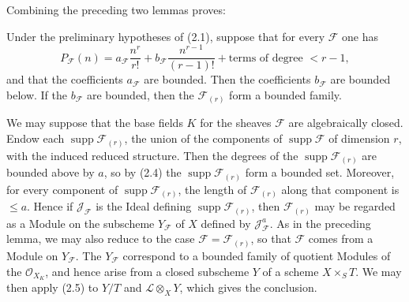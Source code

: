 Combining the preceding two lemmas proves:

 Under the preliminary hypotheses of (2.1), suppose that for
every $\mathcal F$ one has
\[
P_{\mathcal F}(n)=a_{\mathcal F}\frac{n^r}{r!}
+b_{\mathcal F}\frac{n^{r-1}}{(r-1)!}
+\text{terms of degree $<r-1$},
\]
and that the coefficients $a_{\mathcal F}$ are bounded. Then the coefficients
$b_{\mathcal F}$ are bounded below. If the $b_{\mathcal F}$ are bounded, then
the $\mathcal F_{(r)}$ form a bounded family.

We may suppose that the base fields $K$ for the sheaves $\mathcal F$ are
algebraically closed. Endow each
$\operatorname{supp}\mathcal F_{(r)}$, the union of the components of
$\operatorname{supp}\mathcal F$ of dimension $r$, with the induced reduced
structure. Then the degrees of the $\operatorname{supp}\mathcal F_{(r)}$ are
bounded above by $a$, so by (2.4) the $\operatorname{supp}\mathcal F_{(r)}$
form a bounded set. Moreover, for every component of
$\operatorname{supp}\mathcal F_{(r)}$, the length of $\mathcal F_{(r)}$ along
that component is $\leq a$. Hence if $\mathcal J_{\mathcal F}$ is the Ideal
defining $\operatorname{supp}\mathcal F_{(r)}$, then $\mathcal F_{(r)}$
may be regarded as a Module on the subscheme $Y_{\mathcal F}$ of $X$ defined
by $\mathcal J_{\mathcal F}^{a}$. As in the preceding lemma, we may also
reduce to the case $\mathcal F=\mathcal F_{(r)}$, so that $\mathcal F$ comes
from a Module on $Y_{\mathcal F}$. The $Y_{\mathcal F}$ correspond to a
bounded family of quotient Modules of the $\mathcal O_{X_K}$, and hence arise
from a closed subscheme $Y$ of a scheme $X\times_S T$. We may then apply (2.5)
to $Y/T$ and $\mathcal L\otimes_XY$, which gives the conclusion.

